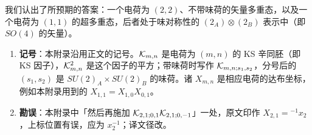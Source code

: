 我们认出了所预期的答案：一个电荷为 $(2,2)$、不带味荷的矢量多重态，以及一个电荷为 $(1,1)$ 的超多重态，后者处于味对称性的 $(2_A)\otimes (2_B)$ 表示中（即 $SO(4)$ 的矢量）。

\begin{yizhu}
\begin{enumerate}[leftmargin=2em,itemsep=2pt,topsep=2pt]
\item \textbf{记号}：本附录沿用正文的记号。$\mathcal{K}_{m,n}$ 是电荷为 $(m,n)$ 的 KS 辛同胚（即 KS 因子），$\mathcal{K}_{m,n}^{2}$ 是这个因子的平方；带味荷时写作 $\mathcal{K}_{m,n;s_1,s_2}$，分号后的 $(s_1,s_2)$ 是 $SU(2)_A\times SU(2)_B$ 的味荷。诸 $X_{m,n}$ 是相应电荷的达布坐标，例如本附录用到的 $X_{1,1}=X_{1,0}X_{0,1}$。
\item \textbf{勘误}：本附录中「然后再施加 $\mathcal{K}_{2,1;0,1}\mathcal{K}_{2,1;0,-1}$」一处，原文印作 $X_{2,1}={}^{-1}x_2$，上标位置有误，应为 $x_2^{-1}$；译文径改。
\end{enumerate}
\end{yizhu}
